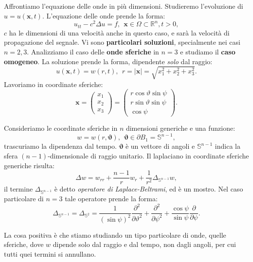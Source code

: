 \documentclass[10pt,a4paper,twoside,openright]{book}
\newcommand{\x}{\mathbf{x}}
\begin{document}
Affrontiamo l'equazione delle onde in più dimensioni. Studieremo l'evoluzione di $u=u(\x ,t)$. L'equazione delle onde prende la forma:
\begin{equation}
	u_{tt} -c^{2} \Delta u=f,\ \ \x \in \Omega \subset \mathbb{R}^{n} ,t >0,
\end{equation}
$c$ ha le dimensioni di una velocità anche in questo caso, e sarà la velocità di propagazione del segnale. Vi sono \textbf{particolari soluzioni}, specialmente nei casi $n=2,3$. Analizziamo il caso delle \textbf{onde sferiche} in $n=3$ e studiamo il \textbf{caso omogeneo}. La soluzione prende la forma, dipendente \textit{solo} dal raggio:
\begin{equation*}
	u(\x ,t) =w( r,t) ,\ \ r=| \x| =\sqrt{x_{1}^{2} +x_{2}^{2} +x_{3}^{2}} .
\end{equation*}
Lavoriamo in coordinate sferiche:
\begin{equation*}
	\x =
	\begin{pmatrix}
		x_{1} \\
		x_{2} \\
		x_{3} 
	\end{pmatrix} =
	\begin{pmatrix}
		r\cos \vartheta \sin \psi \\
		r\sin \vartheta \sin \psi \\
		\cos \psi                 
	\end{pmatrix} .
\end{equation*}
\begin{nb}
	Consideriamo le coordinate sferiche in $n$ dimensioni generiche e una funzione:
	\begin{equation*}
		w=w( r,\bm{\vartheta }) ,\ \ \bm{\vartheta } \in \partial B_{1} =\mathbb{S}^{n-1} ,
	\end{equation*}
	trascuriamo la dipendenza dal tempo. $\bm{\vartheta }$ è un vettore di angoli e $\mathbb{S}^{n-1}$ indica la sfera $( n-1)$-dimensionale di raggio unitario. Il laplaciano in coordinate sferiche generiche risulta:
	\begin{equation}
		\Delta w=w_{rr} +\frac{n-1}{r} w_{r} +\frac{1}{r^{2}} \Delta _{\mathbb{S}^{n-1}} w,
	\end{equation}
	il termine $\Delta _{\mathbb{S}^{n-1}}$ è detto \textit{operatore di Laplace-Beltrami}, ed è un mostro. Nel caso particolare di $n=3$ tale operatore prende la forma:
	\begin{equation}
		\Delta _{\mathbb{S}^{n-1}} =\Delta _{\mathbb{S}^{2}} =\frac{1}{(\sin \psi )^{2}}\frac{\partial ^{2}}{\partial \vartheta ^{2}} +\frac{\partial ^{2}}{\partial \psi ^{2}} +\frac{\cos \psi }{\sin \psi }\frac{\partial }{\partial \psi } .
	\end{equation}
\end{nb}
La cosa positiva è che stiamo studiando un tipo particolare di onde, quelle sferiche, dove $w$ dipende solo dal raggio e dal tempo, non dagli angoli, per cui tutti quei termini si annullano.
\end{document}
